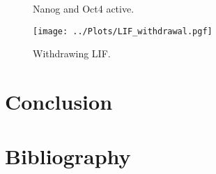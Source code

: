 \begin{figure}
\centering
\begin{minipage}[t]{0.3\textwidth}
\centering
\graphicspath{{../Plots/}}

\end{minipage}
\hspace*{0.5cm}
\begin{minipage}[t]{0.3\textwidth}
\centering
\graphicspath{{../Plots/}}

\end{minipage}
\caption{Nanog and Oct4 active.}
\label{pl:NO}
\end{figure}


\begin{figure}
\centering
\graphicspath{{../Plots/}}
\texttt{[image: ../Plots/LIF\_withdrawal.pgf]}
\caption{Withdrawing LIF.}
\label{pl:LIF_withdrawal}
\end{figure}

\section{Conclusion}

\newpage
\section*{Bibliography}
\nocite{*}
\printbibliography[heading=none, keyword={secondary}]



